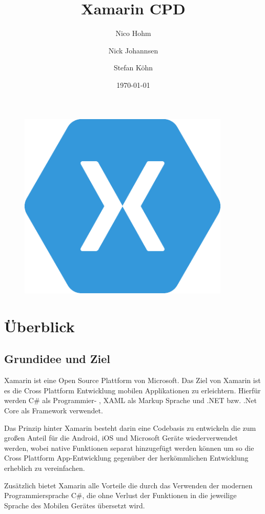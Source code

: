 \documentclass[12pt]{article}
\title{\textbf{Xamarin CPD}}
\author{
    Nico Hohm
    \and
    Nick Johannsen
    \and
    Stefan Köhn
    }
\date{\today}
\begin{document}
\pagestyle{empty}
\maketitle
\thispagestyle{empty}
\begin{figure}[h]
 \centering
 \includegraphics[width=0.9\textwidth]{xamarin-logo}
\end{figure}
\newpage
\tableofcontents
\newpage

\pagestyle{plain}
\section{Überblick}

\subsection{Grundidee und Ziel}
Xamarin ist eine Open Source Plattform von Microsoft. Das Ziel von Xamarin ist es die Cross Plattform Entwicklung mobilen Applikationen zu erleichtern. Hierfür werden C\# als Programmier- , XAML als Markup Sprache und .NET bzw. .Net Core als Framework verwendet.

Das Prinzip hinter Xamarin besteht darin eine Codebasis zu entwickeln die zum großen Anteil für die Android, iOS und Microsoft Geräte wiederverwendet werden, wobei native Funktionen separat hinzugefügt werden können um so die Cross Plattform App-Entwicklung gegenüber der herkömmlichen Entwicklung erheblich zu vereinfachen.

Zusätzlich bietet Xamarin alle Vorteile die durch das Verwenden der modernen Programmiersprache C\#, die ohne Verlust der Funktionen in die jeweilige Sprache des Mobilen Gerätes übersetzt wird.
\end{document}
